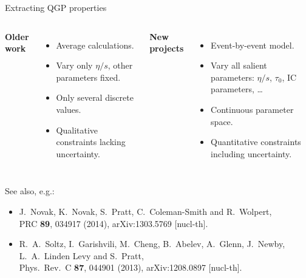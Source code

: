 \documentclass{beamer}
\begin{document}
\begin{frame}{Extracting QGP properties}
  \vspace{1em}
  \begin{columns}
    \begin{center}
      \bf Older work
    \end{center}
    \begin{itemize}
      \item Average calculations.
        \sms
      \item Vary only $\eta/s$, other parameters fixed.
        \sms
      \item Only several discrete values.
        \sms
      \item Qualitative constraints lacking uncertainty.
    \end{itemize}

    \begin{center}
      \bf New projects
    \end{center}
    \begin{itemize}
      \item Event-by-event model.
        \sms
      \item Vary all salient parameters:  $\eta/s$, $\tau_0$, IC parameters, \ldots
        \sms
      \item Continuous parameter space.
        \sms
      \item Quantitative constraints including uncertainty.
    \end{itemize}
  \end{columns}
  
  \vspace{2em}
  \tiny
  See also, e.g.: \\
  \begin{itemize}
    \item J.~Novak, K.~Novak, S.~Pratt, C.~Coleman-Smith and R.~Wolpert, \\
      PRC \textbf{89}, 034917 (2014), arXiv:1303.5769 [nucl-th].
    \item R.~A.~Soltz, I.~Garishvili, M.~Cheng, B.~Abelev, A.~Glenn, J.~Newby, L.~A.~Linden Levy and S.~Pratt, \\
      Phys.\ Rev.\ C {\bf 87}, 044901 (2013), arXiv:1208.0897 [nucl-th].
  \end{itemize}


\end{frame}
\end{document}
